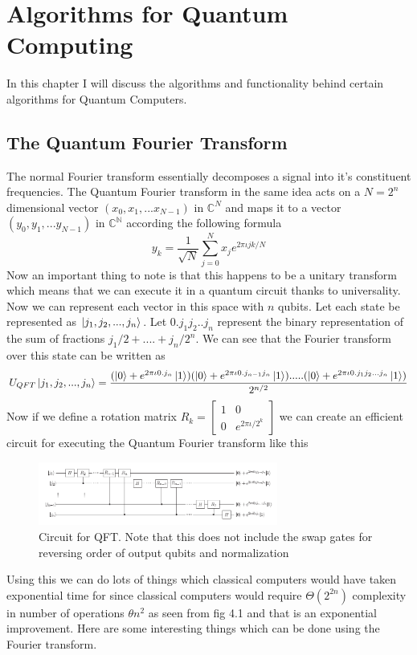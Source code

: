 \documentclass{report}
\begin{document}
\chapter{Algorithms for Quantum Computing}
In this chapter I will discuss the algorithms and functionality behind certain algorithms for Quantum Computers.

\section{The Quantum Fourier Transform}
The normal Fourier transform essentially decomposes a signal into it's constituent frequencies. The Quantum Fourier transform in the same idea acts on a $N = 2^n$ dimensional vector $(x_0,x_1,...x_{N-1})$ in $\mathbb{C}^{N}$ and maps it to a vector $(y_0,y_1,...y_{N-1})$ in $\mathbb{C^N}$ according the following formula
$$y_k = \dfrac{1}{\sqrt{N}}\sum_{j = 0}^{N}x_{j}e^{2\pi\iota{jk/N}}$$
Now an important thing to note is that this happens to be a unitary transform which means that we can execute it in a quantum circuit thanks to universality.
Now we can represent each vector in this space with $n$ qubits. Let each state be represented as $\ket{j_1,j_2,...,j_n}$. Let $0.j_1j_2..j_n$ represent the binary representation of the sum of fractions ${j_1}/{2} + .... + {j_n}/{2^n}$. We can see that the Fourier transform over this state can be written as
\begin{equation}U_{QFT}\ket{j_1,j_2,...,j_n} = \dfrac{(\ket{0} + e^{2\pi\iota0.j_n}\ket{1})(\ket{0} + e^{2\pi\iota0.j_{n-1}j_{n}}\ket{1}).....(\ket{0} + e^{2\pi\iota0.j_{1}j_{2}...j_{n}}\ket{1})}{2^{n/2}}\end{equation}
Now if we define a rotation matrix $R_k = \begin{bmatrix}1 & 0\\0 & e^{2\pi\iota/2^k}\end{bmatrix}$ we can create an efficient circuit for executing the Quantum Fourier transform like this
\begin{figure}[ht]
    \centering
    \includegraphics[width = 0.7\textwidth]{images/QFT circuit.png}
    \caption{Circuit for QFT. Note that this does not include the swap gates for reversing order of output qubits and normalization}
\end{figure}
Using this we can do lots of things which classical computers would have taken exponential time for since classical computers would require $\Theta(2^{2n})$ complexity in number of operations $\theta{n^2}$ as seen from fig 4.1 and that is an exponential improvement. Here are some interesting things which can be done using the Fourier transform.
\end{document}
